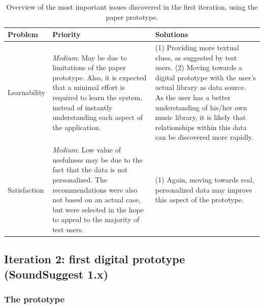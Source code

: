 \begin{table}%
	\caption{Overview of the most important issues discovered in the first iteration, using the paper prototype.}
	\begin{center}
		\begin{tabular}{p{70px} | p{180px} | p{180px} }
			\hline
			\textbf{Problem} & \textbf{Priority} & \textbf{Solutions} \\
			\hline
			
			Learnability
			&
			\emph{Medium}: May be due to limitations of the paper prototype. Also, it is expected that a minimal effort is required to learn the system, instead of instantly understanding each aspect of the application.
			& (1) Providing more textual clues, as suggested by test users. (2) Moving towards a digital prototype with the user's actual library as data source. As the user has a better understanding of his/her own music library, it is likely that relationships within this data can be discovered more rapidly. %
			\\
			
			Satisfaction
			&
			\emph{Medium}: Low value of usefulness may be due to the fact that the data is not personalized. The recommendations were also not based on an actual case, but were selected in the hope to appeal to the majority of test users.
			&
			(1) Again, moving towards real, personalized data may improve this aspect of the prototype.
			\\
			
			\hline
		\end{tabular}
	\end{center}
\label{table:iteration1:issues}
\end{table}






\subsection{Iteration 2: first digital prototype (SoundSuggest 1.x)}\label{chapter:prototype:section:soundsuggest1}

\subsubsection{The prototype}\label{chapter:prototype:section:soundsuggest1:prototype}

